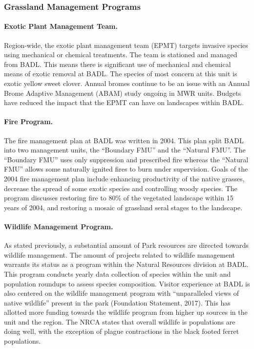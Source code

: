 \subsubsection{Grassland Management Programs}

\paragraph{Exotic Plant Management Team.} Region-wide, the exotic plant management team (EPMT) targets invasive species using mechanical or chemical treatments. 
The team is stationed and managed from BADL.
This means there is significant use of mechanical and chemical means of exotic removal at BADL. 
The species of most concern at this unit is exotic yellow sweet clover. 
Annual bromes continue to be an issue with an Annual Brome Adaptive Management (ABAM) study ongoing in MWR units.
Budgets have reduced the impact that the EPMT can have on landscapes within BADL.

\paragraph{Fire Program.} The fire management plan at BADL was written in 2004. 
This plan split BADL into two management units, the ``Boundary FMU'' and the ``Natural FMU''. 
The ``Boundary FMU'' uses only suppression and prescribed fire whereas the ``Natural FMU'' allows some naturally ignited fires to burn under supervision.
Goals of the 2004 fire management plan include enhancing productivity of the native grasses, decrease the spread of some exotic species and controlling woody species. 
The program discusses restoring fire to 80\% of the vegetated landscape within 15 years of 2004, and restoring a mosaic of grassland seral stages to the landscape.

\paragraph{Wildlife Management Program.} As stated previously, a substantial amount of Park resources are directed towards wildlife management. 
The amount of projects related to wildlife management warrants its status as a program within the Natural Resources division at BADL. 
This program conducts yearly data collection of species within the unit and population roundups to assess species composition. 
Visitor experience at BADL is also centered on the wildlife management program with ``unparalleled views of native wildlife'' present in the park (Foundation Statement, 2017). 
This has allotted more funding towards the wildlife program from higher up sources in the unit and the region. 
The NRCA states that overall wildlife is populations are doing well, with the exception of plague contractions in the black footed ferret populations.

